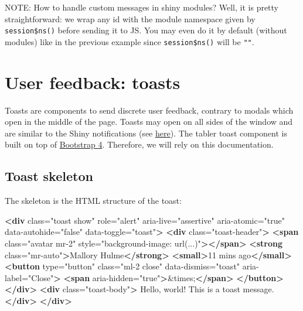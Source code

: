 \documentclass[
]{book}
\newenvironment{Shaded}{\begin{snugshade}}{\end{snugshade}}
\newcommand{\DecValTok}[1]{\textcolor[rgb]{0.00,0.00,0.81}{#1}}
\newcommand{\KeywordTok}[1]{\textcolor[rgb]{0.13,0.29,0.53}{\textbf{#1}}}
\newcommand{\NormalTok}[1]{#1}
\newcommand{\OtherTok}[1]{\textcolor[rgb]{0.56,0.35,0.01}{#1}}
\newcommand{\StringTok}[1]{\textcolor[rgb]{0.31,0.60,0.02}{#1}}
\begin{document}
NOTE: How to handle custom messages in shiny modules? Well, it is pretty straightforward: we wrap any id with the module namespace given by \texttt{session\$ns()} before sending it to JS. You may even do it by default (without modules) like in the previous example since \texttt{session\$ns()} will be \texttt{""}.

\hypertarget{user-feedback-toasts}{%
\section{User feedback: toasts}\label{user-feedback-toasts}}

Toasts are components to send discrete user feedback, contrary to modals which open in the middle of the page. Toasts may open on all sides of the window and are similar to the Shiny notifications (see \href{https://shiny.rstudio.com/reference/shiny/0.14/showNotification.html}{here}). The tabler toast component is built on top of \href{https://getbootstrap.com/docs/4.3/components/toasts/}{Bootstrap 4}. Therefore, we will rely on this documentation.

\hypertarget{toast-skeleton}{%
\subsection{Toast skeleton}\label{toast-skeleton}}

The skeleton is the HTML structure of the toast:

\begin{Shaded}
\begin{Highlighting}[]
\KeywordTok{<div}\OtherTok{ class=}\StringTok{"toast show"}\OtherTok{ role=}\StringTok{"alert"}\OtherTok{ aria-live=}\StringTok{"assertive"}\OtherTok{ aria-atomic=}\StringTok{"true"}\OtherTok{ data-autohide=}\StringTok{"false"}\OtherTok{ data-toggle=}\StringTok{"toast"}\KeywordTok{>}
  \KeywordTok{<div}\OtherTok{ class=}\StringTok{"toast-header"}\KeywordTok{>}
    \KeywordTok{<span}\OtherTok{ class=}\StringTok{"avatar mr-2"}\OtherTok{ style=}\StringTok{"background-image: url(...)"}\KeywordTok{></span>}
    \KeywordTok{<strong}\OtherTok{ class=}\StringTok{"mr-auto"}\KeywordTok{>}\NormalTok{Mallory Hulme}\KeywordTok{</strong>}
    \KeywordTok{<small>}\NormalTok{11 mins ago}\KeywordTok{</small>}
    \KeywordTok{<button}\OtherTok{ type=}\StringTok{"button"}\OtherTok{ class=}\StringTok{"ml-2 close"}\OtherTok{ data-dismiss=}\StringTok{"toast"}\OtherTok{ aria-label=}\StringTok{"Close"}\KeywordTok{>}
      \KeywordTok{<span}\OtherTok{ aria-hidden=}\StringTok{"true"}\KeywordTok{>}\DecValTok{&times;}\KeywordTok{</span>}
    \KeywordTok{</button>}
  \KeywordTok{</div>}
  \KeywordTok{<div}\OtherTok{ class=}\StringTok{"toast-body"}\KeywordTok{>}
\NormalTok{  Hello, world! This is a toast message.}
  \KeywordTok{</div>}
\KeywordTok{</div>}
\end{Highlighting}
\end{Shaded}
\end{document}
